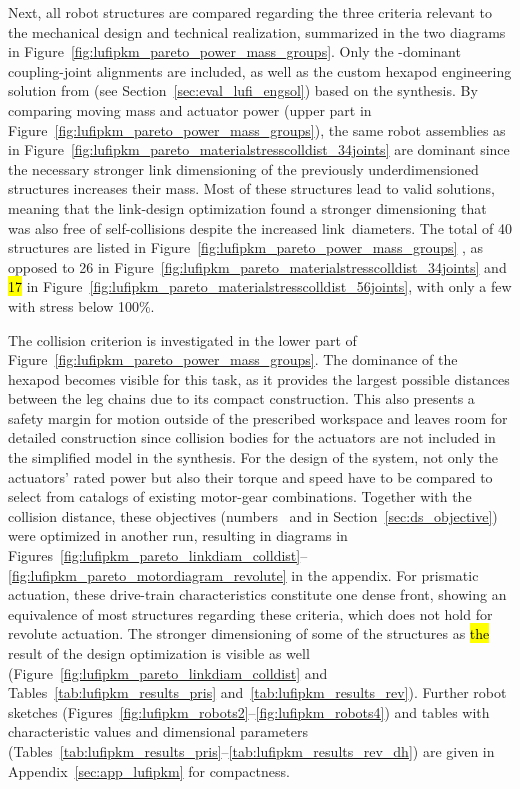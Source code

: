 Next, all robot structures are compared regarding the three criteria relevant to the mechanical design and technical realization, summarized in the two  diagrams in Figure~\ref{fig:lufipkm_pareto_power_mass_groups}.
Only the -dominant coupling-joint alignments are included, as well as the custom hexapod engineering solution from \cite{Fettin2023_M1174} (see Section~\ref{sec:eval_lufi_engsol}) based on the synthesis.
By comparing moving mass and actuator power (upper part in Figure~\ref{fig:lufipkm_pareto_power_mass_groups}), the same robot assemblies as in Figure~\ref{fig:lufipkm_pareto_materialstresscolldist_34joints} are dominant since the necessary stronger link dimensioning of the previously underdimensioned structures increases their mass.
Most of these structures lead to valid solutions, meaning that the link-design optimization found a stronger dimensioning that was also free of self-collisions despite the increased link~diameters.
The total of 40 structures are listed in Figure~\ref{fig:lufipkm_pareto_power_mass_groups}%
%
, as opposed to 26 in Figure~\ref{fig:lufipkm_pareto_materialstresscolldist_34joints} and \hl{17} in Figure~\ref{fig:lufipkm_pareto_materialstresscolldist_56joints}, with only a few with stress below 100\%. %

The collision criterion is investigated in the lower part of Figure~\ref{fig:lufipkm_pareto_power_mass_groups}.
The dominance of the hexapod becomes visible for this task, as {it} provides the largest possible distances between the leg chains due to its compact construction.
This also presents a safety margin for motion outside of the prescribed workspace and leaves room for detailed construction since collision bodies for the actuators are not included in the simplified model in the synthesis.
For the design of the system, not only the actuators' rated power but also their torque and speed have to be compared to select from catalogs of existing motor-gear combinations.
Together with the collision distance, these objectives (numbers~ and  in Section~\ref{sec:ds_objective}) were optimized in another run, resulting in  diagrams in \mbox{Figures~\ref{fig:lufipkm_pareto_linkdiam_colldist}--\ref{fig:lufipkm_pareto_motordiagram_revolute}} in the appendix.
For prismatic actuation, these drive-train characteristics constitute one dense  front, showing an equivalence of most structures regarding these criteria, which does not hold for revolute actuation.
The stronger dimensioning of some of the structures as \hl{the} result of the design optimization is visible as well (Figure~\ref{fig:lufipkm_pareto_linkdiam_colldist} and Tables~\ref{tab:lufipkm_results_pris} and~\ref{tab:lufipkm_results_rev}). %
Further robot sketches (Figures~\ref{fig:lufipkm_robots2}--\ref{fig:lufipkm_robots4}) and tables with characteristic values and dimensional parameters (Tables~\ref{tab:lufipkm_results_pris}--\ref{tab:lufipkm_results_rev_dh}) are given in Appendix~\ref{sec:app_lufipkm} for compactness.

